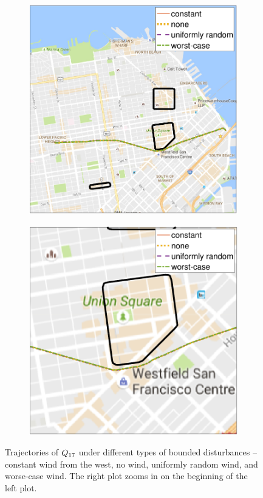 \begin{figure}[!htb]
  \centering
  \begin{subfigure}{0.5\textwidth}
    \includegraphics[width=\columnwidth]{figs/dstb_trajs}
    \subcaption{}
    \label{fig:dstb_trajs_s1}
  \end{subfigure}%
  \begin{subfigure}{0.5\textwidth}
    \includegraphics[width=\columnwidth]{figs/dstb_trajs_zoomed_in}
    \subcaption{}
    \label{fig:dstb_trajs_s2}
  \end{subfigure}%

  \caption{Trajectories of $Q_{17}$ under different types of bounded disturbances -- constant wind from the west, no wind, uniformly random wind, and worse-case wind. The right plot zooms in on the beginning of the left plot.}
  \label{fig:dstb_trajs}
\end{figure}

